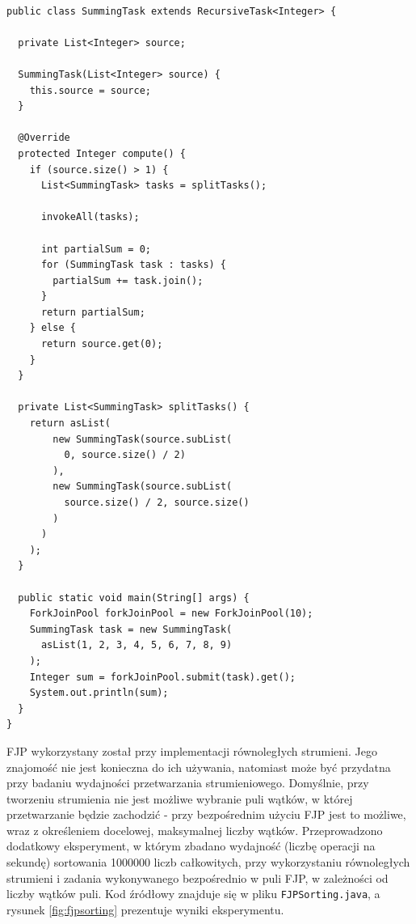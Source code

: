 \documentclass[12pt]{extarticle}
\begin{document}
\begin{lstlisting}[label=fjpexample, caption=Przykładowe wykorzystanie FJP]

public class SummingTask extends RecursiveTask<Integer> {
  
  private List<Integer> source;
  
  SummingTask(List<Integer> source) {
    this.source = source;
  }
  
  @Override
  protected Integer compute() {
    if (source.size() > 1) {
      List<SummingTask> tasks = splitTasks();
      
      invokeAll(tasks);
      
      int partialSum = 0;
      for (SummingTask task : tasks) {
        partialSum += task.join();
      }
      return partialSum;
    } else {
      return source.get(0);
    }
  }
  
  private List<SummingTask> splitTasks() {
    return asList(
        new SummingTask(source.subList(
          0, source.size() / 2)
        ),
        new SummingTask(source.subList(
          source.size() / 2, source.size()
        )
      )
    );
  }
  
  public static void main(String[] args) {
    ForkJoinPool forkJoinPool = new ForkJoinPool(10);
    SummingTask task = new SummingTask(
      asList(1, 2, 3, 4, 5, 6, 7, 8, 9)
    );
    Integer sum = forkJoinPool.submit(task).get();
    System.out.println(sum);
  }
}

\end{lstlisting}

    FJP wykorzystany został przy implementacji równoległych strumieni. Jego znajomość nie jest konieczna do ich używania, natomiast może być przydatna przy badaniu wydajności przetwarzania strumieniowego. Domyślnie, przy tworzeniu strumienia nie jest możliwe wybranie puli wątków, w której przetwarzanie będzie zachodzić - przy bezpośrednim użyciu FJP jest to możliwe, wraz z określeniem docelowej, maksymalnej liczby wątków. Przeprowadzono dodatkowy eksperyment, w którym zbadano wydajność (liczbę operacji na sekundę) sortowania 1000000 liczb całkowitych, przy wykorzystaniu równoległych strumieni i zadania wykonywanego bezpośrednio w puli FJP, w zależności od liczby wątków puli. Kod źródłowy znajduje się w pliku \texttt{FJPSorting.java}, a rysunek \ref{fig:fjpsorting} prezentuje wyniki eksperymentu.
\end{document}
